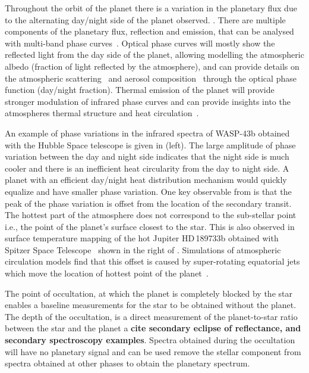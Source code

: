 Throughout the orbit of the planet there is a variation in the planetary flux due to the alternating day/night side of the planet observed. .
There are multiple components of the planetary flux, reflection and emission, that can be analysed with multi-band phase curves~\citep[e.g.][]{knutson_characterizing_2009, esteves_optical_2013}.
Optical phase curves will mostly show the reflected light from the day side of the planet, allowing modelling the atmospheric albedo (fraction of light reflected by the atmosphere), and can provide details on the atmospheric scattering~\citep{madhusudhan_analytic_2012} and aerosol composition~\citep{oreshenko_optical_2016} through the optical phase function (day/night fraction).
Thermal emission of the planet will provide stronger modulation of infrared phase curves and can provide insights into the atmospheres thermal
structure and heat circulation~\citep{goodman_thermodynamics_2009, koll_temperature_2016}.

An example of phase variations in the infrared spectra of {WASP-43b} obtained with the Hubble Space telescope is given in  (left).
The large amplitude of phase variation between the day and night side indicates that the night side is much cooler and there is an inefficient heat circularity from the day to night side.
A planet with an efficient day/night heat distribution mechanism would quickly equalize and have smaller phase variation.
One key observable from  is that the peak of the phase variation is offset from the location of the secondary transit.
The hottest part of the atmosphere does not correspond to the sub-stellar point i.e., the point of the planet's surface closest to the star.
This is also observed in surface temperature mapping of the hot Jupiter HD\,189733b obtained with {Spitzer Space Telescope}~\citep{knutson_map_2007} shown in the right of .
Simulations of atmospheric circulation models find that this offset is caused by super-rotating equatorial jets which move the location of hottest point of the planet~\citep[e.g.][and references therein]{heng_atmospheric_2015}.

The point of occultation, at which the planet is completely blocked by the star enables a baseline measurements for the star to be obtained without the planet.
The depth of the occultation, is a direct measurement of the planet-to-star ratio between the star and the planet a \textbf{{cite secondary eclipse of reflectance, and secondary spectroscopy examples}}.
Spectra obtained during the occultation will have no planetary signal and can be used remove the stellar component from spectra obtained at other phases to obtain the planetary spectrum.


